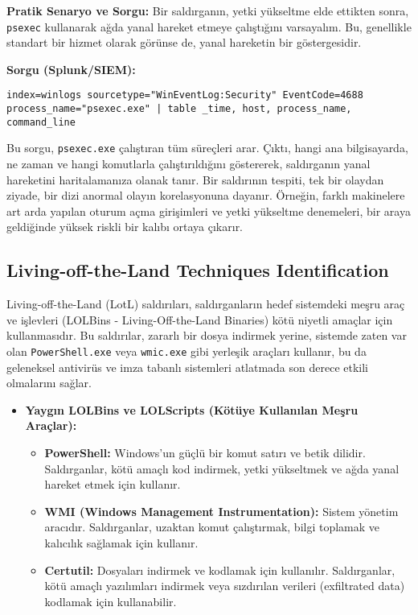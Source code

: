 \textbf{Pratik Senaryo ve Sorgu:}
Bir saldırganın, yetki yükseltme elde ettikten sonra, \texttt{psexec} kullanarak ağda yanal hareket etmeye çalıştığını varsayalım. Bu, genellikle standart bir hizmet olarak görünse de, yanal hareketin bir göstergesidir.

\textbf{Sorgu (Splunk/SIEM):}
\begin{verbatim}
index=winlogs sourcetype="WinEventLog:Security" EventCode=4688 
process_name="psexec.exe" | table _time, host, process_name, command_line
\end{verbatim}

Bu sorgu, \texttt{psexec.exe} çalıştıran tüm süreçleri arar. Çıktı, hangi ana bilgisayarda, ne zaman ve hangi komutlarla çalıştırıldığını göstererek, saldırganın yanal hareketini haritalamanıza olanak tanır. Bir saldırının tespiti, tek bir olaydan ziyade, bir dizi anormal olayın korelasyonuna dayanır. Örneğin, farklı makinelere art arda yapılan oturum açma girişimleri ve yetki yükseltme denemeleri, bir araya geldiğinde yüksek riskli bir kalıbı ortaya çıkarır.

\subsection{Living-off-the-Land Techniques Identification}

Living-off-the-Land (LotL) saldırıları, saldırganların hedef sistemdeki meşru araç ve işlevleri (LOLBins - Living-Off-the-Land Binaries) kötü niyetli amaçlar için kullanmasıdır. Bu saldırılar, zararlı bir dosya indirmek yerine, sistemde zaten var olan \texttt{PowerShell.exe} veya \texttt{wmic.exe} gibi yerleşik araçları kullanır, bu da geleneksel antivirüs ve imza tabanlı sistemleri atlatmada son derece etkili olmalarını sağlar.

\begin{itemize}
    \item \textbf{Yaygın LOLBins ve LOLScripts (Kötüye Kullanılan Meşru Araçlar):}
    \begin{itemize}
        \item \textbf{PowerShell:} Windows'un güçlü bir komut satırı ve betik dilidir. Saldırganlar, kötü amaçlı kod indirmek, yetki yükseltmek ve ağda yanal hareket etmek için kullanır.
        \item \textbf{WMI (Windows Management Instrumentation):} Sistem yönetim aracıdır. Saldırganlar, uzaktan komut çalıştırmak, bilgi toplamak ve kalıcılık sağlamak için kullanır.
        \item \textbf{Certutil:} Dosyaları indirmek ve kodlamak için kullanılır. Saldırganlar, kötü amaçlı yazılımları indirmek veya sızdırılan verileri (exfiltrated data) kodlamak için kullanabilir.
    \end{itemize}
\end{itemize}

